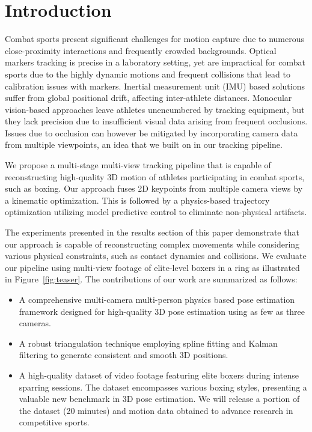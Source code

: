 \documentclass{egpubl}
\begin{document}
\section{Introduction}
Combat sports present significant challenges for motion capture due to numerous close-proximity interactions and frequently crowded backgrounds. 
Optical markers tracking is precise in a laboratory setting, yet are impractical for combat sports due to the highly dynamic motions and frequent collisions that lead to calibration issues with markers. Inertial measurement unit (IMU) based solutions suffer from global positional drift, affecting inter-athlete distances. Monocular vision-based approaches leave athletes unencumbered by tracking equipment, but they lack precision due to insufficient visual data arising from frequent occlusions. Issues due to occlusion can however be mitigated by incorporating camera data from multiple viewpoints, an idea that we built on in our tracking pipeline.

We propose a multi-stage multi-view tracking pipeline that is capable of reconstructing high-quality 3D motion of athletes participating in combat sports, such as boxing. Our approach fuses 2D keypoints from multiple camera views by a kinematic optimization.  This is followed by a physics-based trajectory optimization utilizing model predictive control to eliminate non-physical artifacts.

The experiments presented in the results section of this paper demonstrate that 
our approach is capable of reconstructing complex movements while considering 
various physical constraints, such as contact dynamics and collisions. 
We evaluate our pipeline using multi-view footage of
elite-level boxers in a ring as illustrated in Figure~\ref{fig:teaser}. 
The contributions of our work are summarized as follows:
\begin{itemize}
    \item A comprehensive multi-camera multi-person physics based pose estimation framework designed for high-quality 3D pose estimation using as few as three cameras.
    \item A robust triangulation technique employing spline fitting and Kalman filtering to generate consistent and smooth 3D positions.
    \item A high-quality dataset of video footage featuring elite boxers during intense sparring sessions. The dataset encompasses various boxing styles, presenting a valuable new benchmark in 3D pose estimation. We will release a portion of the dataset (20 minutes) and motion data obtained to advance research in competitive sports.
\end{itemize}
\end{document}
